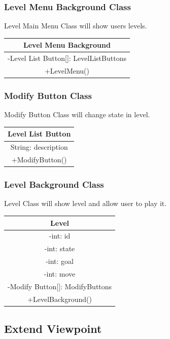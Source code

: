 \subsubsection{Level Menu Background Class}
Level Main Menu Class will show users levels.
\begin{center}\begin{tabular}{ |c| } \hline Level Menu Background \\ \hline -Level List Button[]: LevelListButtons \\ \hline +LevelMenu() \\ \hline \end{tabular}\end{center}

\subsubsection{Modify Button Class}
Modify Button Class will change state in level.
\begin{center}\begin{tabular}{ |c| } \hline Level List Button \\ \hline String: description\\ \hline +ModifyButton() \\ \hline \end{tabular}\end{center}

\subsubsection{Level Background Class}
Level Class will show level and allow user to play it.
\begin{center}\begin{tabular}{ |c| } \hline Level \\ \hline -int: id \\ -int: state \\ -int: goal \\ -int: move \\ -Modify Button[]: ModifyButtons \\ \hline +LevelBackground() \\ \hline \end{tabular}\end{center}
\subsection{Extend Viewpoint}
